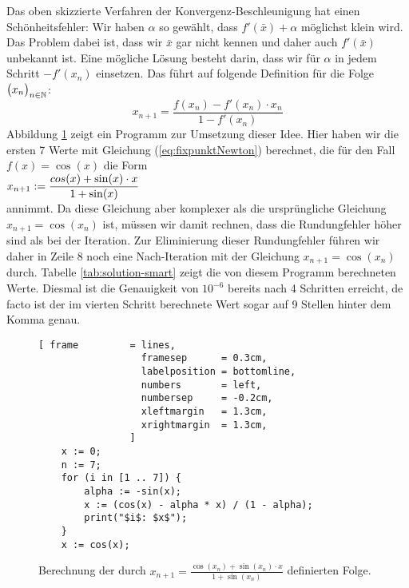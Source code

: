 Das oben skizzierte Verfahren der Konvergenz-Beschleunigung hat einen Sch\"onheitsfehler:
Wir haben $\alpha$  so gew\"ahlt, dass $f'(\bar{x}) + \alpha$ m\"oglichst klein
wird.  Das Problem dabei ist, dass wir $\bar{x}$ gar nicht kennen und daher auch
$f'(\bar{x})$ unbekannt ist.  Eine m\"ogliche L\"osung besteht darin, dass wir f\"ur $\alpha$
in jedem Schritt $-f'(x_n)$ einsetzen.  Das f\"uhrt auf folgende
Definition f\"ur die Folge $\bigl(x_n\bigr)_{n\in\mathbb{N}}$:
\begin{equation}
  \label{eq:fixpunktNewton}
   x_{n+1} = \frac{f(x_n) - f'(x_n) \cdot  x_n}{1 - f'(x_n)}  
\end{equation}
Abbildung \ref{fig:cosXisX-newton.stlx} zeigt ein Programm zur Umsetzung dieser Idee.
Hier haben wir die ersten 7 Werte mit Gleichung (\ref{eq:fixpunktNewton})
berechnet, die f\"ur den Fall $f(x) = \cos(x)$ die Form
\\[0.2cm]
\hspace*{1.3cm}
$\displaystyle x_{n+1} := \frac{cos(x) + \sin(x) \cdot x}{1 + \sin(x)}$
\\[0.2cm]
annimmt.  Da diese Gleichung aber komplexer als die urspr\"ungliche Gleichung
$x_{n+1} = \cos(x_n)$ ist, m\"ussen wir damit rechnen, dass die Rundungfehler h\"oher sind als bei der
Iteration.  Zur  Eliminierung dieser Rundungfehler f\"uhren wir daher in Zeile 8
noch eine Nach-Iteration mit der Gleichung $x_{n+1} = \cos(x_n)$ durch.
Tabelle \ref{tab:solution-smart} zeigt die von diesem Programm berechneten Werte.  Diesmal
ist die Genauigkeit von $10^{-6}$ bereits nach 4 Schritten erreicht, de facto ist der im
vierten Schritt berechnete Wert sogar auf 9 Stellen hinter dem Komma genau.


\begin{figure}[!ht]
  \centering
\begin{Verbatim}[ frame         = lines, 
                  framesep      = 0.3cm, 
                  labelposition = bottomline,
                  numbers       = left,
                  numbersep     = -0.2cm,
                  xleftmargin   = 1.3cm,
                  xrightmargin  = 1.3cm,
                ]
    x := 0; 
    n := 7;
    for (i in [1 .. 7]) {
        alpha := -sin(x);
        x := (cos(x) - alpha * x) / (1 - alpha);
        print("$i$: $x$");
    }
    x := cos(x);
\end{Verbatim}
\vspace*{-0.3cm}
  \caption{Berechnung der durch $x_{n+1} = \frac{\cos(x_n) + \sin(x_n) \cdot  x}{1 + \sin(x_n)}$ definierten Folge.}
  \label{fig:cosXisX-newton.stlx}
\end{figure} %

